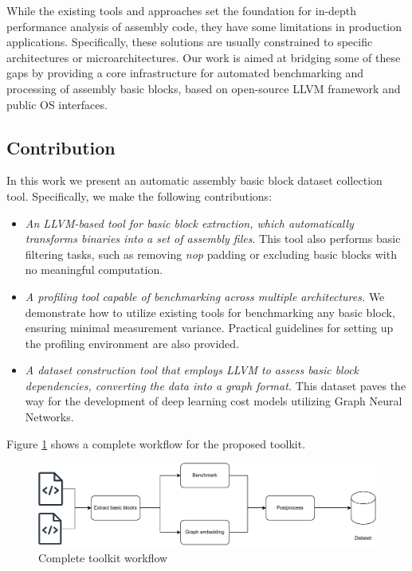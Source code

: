 While the existing tools and approaches set the foundation for in-depth performance analysis of assembly
code, they have some limitations in production applications. Specifically, these solutions are usually
constrained to specific architectures or microarchitectures. Our work is aimed at bridging some of
these gaps by providing a core infrastructure for automated benchmarking and processing of assembly
basic blocks, based on open-source LLVM framework and public OS interfaces.

\subsection{Contribution}

In this work we present an automatic assembly basic block dataset collection tool. Specifically, we make 
the following contributions:
\begin{itemize}
  \item \textit{An LLVM-based tool for basic block extraction, which automatically transforms binaries into a set 
        of assembly files}. This tool also performs basic filtering tasks, such as removing \textit{nop} 
        padding or excluding basic blocks with no meaningful computation.
  \item \textit{A profiling tool capable of benchmarking across multiple architectures.} We demonstrate how to utilize
        existing tools for benchmarking any basic block, ensuring minimal measurement variance. Practical 
        guidelines for setting up the profiling environment are also provided.
  \item \textit{A dataset construction tool that employs LLVM to assess basic block dependencies, converting the 
        data into a graph format.} This dataset paves the way for the development of deep learning cost 
        models utilizing Graph Neural Networks.
\end{itemize}

Figure \ref{fig:workflow} shows a complete workflow for the proposed toolkit.

\begin{figure}[h]
  \centering
  \includegraphics[width=0.8\linewidth]{workflow}
  \caption{Complete toolkit workflow}
  \label{fig:workflow}
\end{figure}

